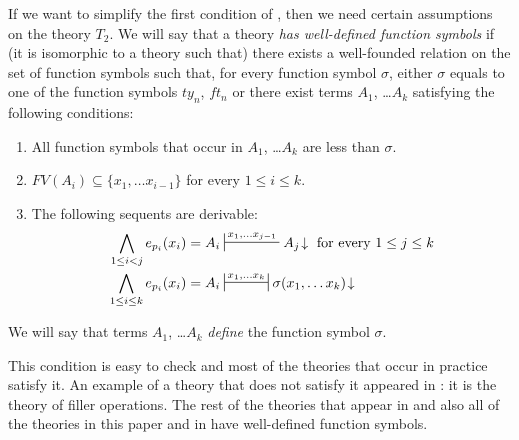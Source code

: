 \documentclass[reqno]{amsart}
\theoremstyle{definition}
\theoremstyle{remark}
\numberwithin{figure}{section}
\begin{document}
If we want to simplify the first condition of , then we need certain assumptions on the theory $T_2$.
We will say that a theory \emph{has well-defined function symbols} if (it is isomorphic to a theory such that) there exists a well-founded relation on the set of function symbols such that,
for every function symbol $\sigma$, either $\sigma$ equals to one of the function symbols $ty_n$, $ft_n$ or there exist terms $A_1$, \ldots $A_k$ satisfying the following conditions:
\begin{enumerate}
\item All function symbols that occur in $A_1$, \ldots $A_k$ are less than $\sigma$.
\item $FV(A_i) \subseteq \{ x_1, \ldots x_{i-1} \}$ for every $1 \leq i \leq k$.
\item The following sequents are derivable:
\begin{align*}
\bigwedge_{1 \leq i < j} e_{p_i}(x_i) = A_i & \sststile{}{x_1, \ldots x_{j-1}} A_j\!\downarrow \text{ for every } 1 \leq j \leq k \\
\bigwedge_{1 \leq i \leq k} e_{p_i}(x_i) = A_i & \ssststile{}{x_1, \ldots x_k} \sigma(x_1, \ldots x_k)\!\downarrow
\end{align*}
\end{enumerate}
We will say that terms $A_1$, \ldots $A_k$ \emph{define} the function symbol $\sigma$.

This condition is easy to check and most of the theories that occur in practice satisfy it.
An example of a theory that does not satisfy it appeared in \cite{alg-models}: it is the theory of filler operations.
The rest of the theories that appear in \cite{alg-models} and also all of the theories in this paper and in \cite{alg-tt} have well-defined function symbols.
\end{document}
